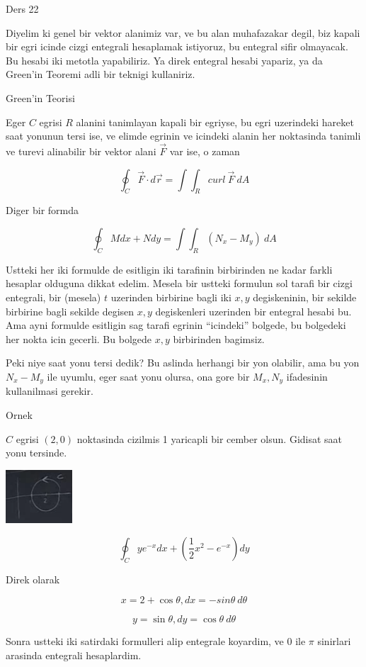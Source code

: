\documentclass[12pt,fleqn]{article}\usepackage{../common}
\begin{document}
Ders 22

Diyelim ki genel bir vektor alanimiz var, ve bu alan muhafazakar degil, biz
kapali bir egri icinde cizgi entegrali hesaplamak istiyoruz, bu entegral
sifir olmayacak. Bu hesabi iki metotla yapabiliriz. Ya direk entegral
hesabi yapariz, ya da Green'in Teoremi adli bir teknigi kullaniriz. 

Green'in Teorisi

Eger $C$ egrisi $R$ alanini tanimlayan kapali bir egriyse, bu egri
uzerindeki hareket saat yonunun tersi ise, ve elimde egrinin ve icindeki
alanin her noktasinda tanimli ve turevi alinabilir bir vektor alani
$\vec{F}$ var ise, o zaman 

\[ \oint_C \vec{F} \cdot d\vec{r} = \int \int_R curl \ \vec{F} \ dA \]

Diger bir formda 

\[ \oint_C M dx + N dy = \int \int_R (N_x - M_y) \ dA \]

Ustteki her iki formulde de esitligin iki tarafinin birbirinden ne kadar
farkli hesaplar olduguna dikkat edelim. Mesela bir ustteki formulun sol
tarafi bir cizgi entegrali, bir (mesela) $t$ uzerinden birbirine bagli iki
$x,y$ degiskeninin, bir sekilde birbirine bagli sekilde degisen $x,y$
degiskenleri uzerinden bir entegral hesabi bu. Ama ayni formulde esitligin
sag tarafi egrinin ``icindeki'' bolgede, bu bolgedeki her nokta icin
gecerli. Bu bolgede $x,y$ birbirinden bagimsiz. 

Peki niye saat yonu tersi dedik? Bu aslinda herhangi bir yon olabilir, ama
bu yon $N_x-M_y$ ile uyumlu, eger saat yonu olursa, ona gore bir $M_x,N_y$
ifadesinin kullanilmasi gerekir. 

Ornek

$C$ egrisi $(2,0)$ noktasinda cizilmis 1 yaricapli bir cember
olsun. Gidisat saat yonu tersinde. 

\includegraphics[height=2cm]{22_1.png}

\[ \oint_C ye^{-x} dx + (\frac{1}{2}x^2 - e^{-x})dy \]

Direk olarak

\[ x = 2 + \cos\theta, dx = -sin\theta \ d\theta \]

\[ y = \sin\theta, dy = \cos\theta \ d\theta \]

Sonra ustteki iki satirdaki formulleri alip entegrale koyardim, ve 0 ile
$\pi$ sinirlari arasinda entegrali hesaplardim. 
\end{document}
